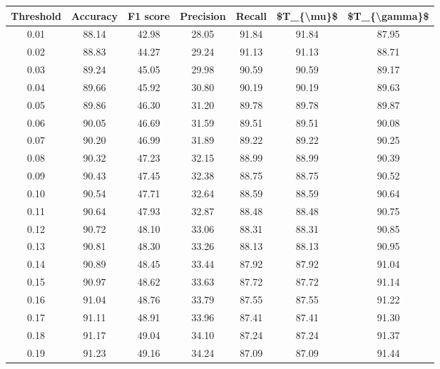 \begin{tabular}{|c|c|c|c|c|c|c|}
\hline
 Threshold &  Accuracy &  F1 score &  Precision &  Recall &  \$T\_\{\textbackslash mu\}\$ &  \$T\_\{\textbackslash gamma\}\$ \\
\hline
      0.01 &     88.14 &     42.98 &      28.05 &   91.84 &      91.84 &         87.95 \\
      0.02 &     88.83 &     44.27 &      29.24 &   91.13 &      91.13 &         88.71 \\
      0.03 &     89.24 &     45.05 &      29.98 &   90.59 &      90.59 &         89.17 \\
      0.04 &     89.66 &     45.92 &      30.80 &   90.19 &      90.19 &         89.63 \\
      0.05 &     89.86 &     46.30 &      31.20 &   89.78 &      89.78 &         89.87 \\
      0.06 &     90.05 &     46.69 &      31.59 &   89.51 &      89.51 &         90.08 \\
      0.07 &     90.20 &     46.99 &      31.89 &   89.22 &      89.22 &         90.25 \\
      0.08 &     90.32 &     47.23 &      32.15 &   88.99 &      88.99 &         90.39 \\
      0.09 &     90.43 &     47.45 &      32.38 &   88.75 &      88.75 &         90.52 \\
      0.10 &     90.54 &     47.71 &      32.64 &   88.59 &      88.59 &         90.64 \\
      0.11 &     90.64 &     47.93 &      32.87 &   88.48 &      88.48 &         90.75 \\
      0.12 &     90.72 &     48.10 &      33.06 &   88.31 &      88.31 &         90.85 \\
      0.13 &     90.81 &     48.30 &      33.26 &   88.13 &      88.13 &         90.95 \\
      0.14 &     90.89 &     48.45 &      33.44 &   87.92 &      87.92 &         91.04 \\
      0.15 &     90.97 &     48.62 &      33.63 &   87.72 &      87.72 &         91.14 \\
      0.16 &     91.04 &     48.76 &      33.79 &   87.55 &      87.55 &         91.22 \\
      0.17 &     91.11 &     48.91 &      33.96 &   87.41 &      87.41 &         91.30 \\
      0.18 &     91.17 &     49.04 &      34.10 &   87.24 &      87.24 &         91.37 \\
      0.19 &     91.23 &     49.16 &      34.24 &   87.09 &      87.09 &         91.44 \\

\end{tabular}

